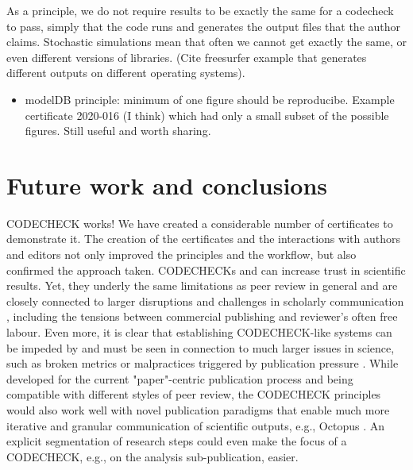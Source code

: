 \documentclass[12pt]{article}
\begin{document}
As a principle, we do not require results to be exactly the same for a
codecheck to pass, simply that the code runs and generates the output
files that the author claims. Stochastic simulations mean that often
we cannot get exactly the same, or even different versions of
libraries.  (Cite freesurfer example \cite{Gronenschild2012-pp} that
generates different outputs on different operating systems).

\begin{itemize}
\item modelDB principle: minimum of one figure should be reproducibe.
  Example certificate 2020-016 (I think) which had only a small subset
  of the possible figures. Still useful and worth sharing.
\end{itemize}

\section*{Future work and conclusions}\label{future-work-and-conclusions}

CODECHECK works!
We have created a considerable number of certificates to demonstrate it.
The creation of the certificates and the interactions with authors and
editors not only improved the principles and the workflow, but also
confirmed the approach taken. CODECHECKs and can increase trust in
scientific results. Yet, they underly the same limitations as peer review
in general and are closely connected to larger disruptions and challenges
in scholarly communication \cite{eglen_recent_2018,tennant_ten_2019}, 
including the tensions between commercial publishing and reviewer's often
free labour.
Even more, it is clear that establishing CODECHECK-like systems can be 
impeded by and must be seen in connection to much larger issues in 
science, such as broken metrics or malpractices triggered by publication
pressure \cite{piwowar_altmetrics:_2013,nosek_promoting_2015}.
While developed for the current "paper"-centric publication process and
being compatible with different styles of peer review, the CODECHECK 
principles would also work well with novel publication paradigms that enable
much more iterative and granular communication of scientific outputs,
e.g., Octopus \cite{}. An explicit segmentation of research steps could
even make the focus of a CODECHECK, e.g., on the analysis sub-publication,
easier.
\end{document}
